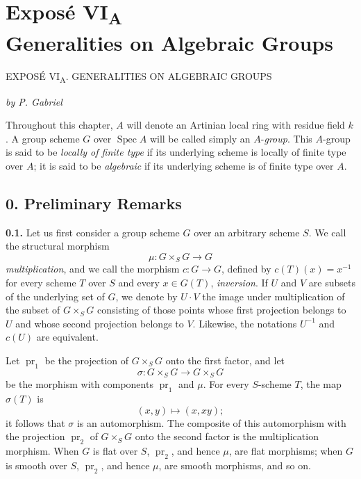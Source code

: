 
\chapter*{Expos\'e \texorpdfstring{VI\textsubscript{A}}{VI_A}\\
Generalities on Algebraic Groups}
\label{sga3:VIA:title}
%
  {EXPOS\'E VI\textsubscript{A}. GENERALITIES ON ALGEBRAIC GROUPS}

\begin{center}
  \textit{by P. Gabriel}
\end{center}

Throughout this
chapter, \(A\) will denote an Artinian local ring with residue field \(k\).
A group scheme \(G\) over \(\operatorname{Spec} A\) will be called simply
an \(A\)-\emph{group}. This \(A\)-group is said to be \emph{locally of
finite type} if its underlying scheme is locally of finite type over \(A\);
it is said to be \emph{algebraic} if its underlying scheme is of finite
type over \(A\).

\section*{0. Preliminary Remarks}
\label{sga3:VIA:0}

\medskip
\noindent\textbf{0.1.}
\label{sga3:VIA:0.1}
Let us first consider a group scheme \(G\) over an arbitrary scheme \(S\).
We call the structural morphism
\[
  \mu:G\times_S G\longrightarrow G
\]
\emph{multiplication}, and we call the morphism \(c:G\to G\), defined by
\(c(T)(x)=x^{-1}\) for every scheme \(T\) over \(S\) and every
\(x\in G(T)\), \emph{inversion}. If \(U\) and \(V\) are subsets of the
underlying set of \(G\), we denote by \(U\cdot V\) the image under
multiplication of the subset of \(G\times_S G\) consisting of those points
whose first projection belongs to \(U\) and whose second projection belongs
to \(V\). Likewise, the notations \(U^{-1}\) and \(c(U)\) are equivalent.

Let \(\operatorname{pr}_1\) be the projection of \(G\times_S G\) onto the
first factor, and let
\[
  \sigma:G\times_S G\longrightarrow G\times_S G
\]
be the morphism with components \(\operatorname{pr}_1\) and \(\mu\). For
every \(S\)-scheme \(T\), the map \(\sigma(T)\) is
\[
  (x,y)\longmapsto (x,xy);
\]
it follows that \(\sigma\) is an automorphism. The composite of this
automorphism with the projection \(\operatorname{pr}_2\) of
\(G\times_S G\) onto the second factor is the multiplication morphism.
When \(G\) is flat over \(S\), \(\operatorname{pr}_2\), and hence \(\mu\),
are flat morphisms; when \(G\) is smooth over \(S\),
\(\operatorname{pr}_2\), and hence \(\mu\), are smooth morphisms, and so
on.

